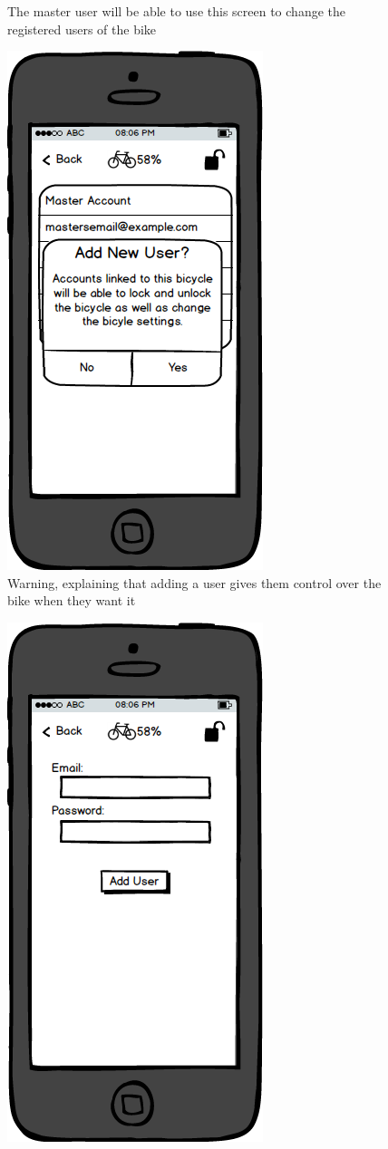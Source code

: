 \documentclass[a4paper]{report}
\begin{document}
{\begin{figure}
\caption{The master user will be able to use this screen to change the registered users of the bike}
\end{figure}
\clearpage
\begin{figure}
\centering
\includegraphics[scale=0.9]{figures/prototype_2/add_user_warn}
\caption{Warning, explaining that adding a user gives them control over the bike when they want it}
\end{figure}
\clearpage
\begin{figure}
\centering
\includegraphics[scale=0.9]{figures/prototype_2/add_user}

\end{figure}}
\end{document}
